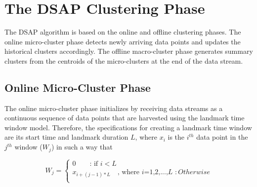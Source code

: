 \documentclass[../UNBThesis2.tex]{subfiles}
\begin{document}





\section{The DSAP Clustering Phase}
The DSAP algorithm is based on the online and offline clustering phases. The online micro-cluster phase detects newly arriving data points and updates the historical clusters accordingly. The offline macro-cluster phase generates summary clusters from the centroids of the micro-clusters at the end of the data stream. 




\subsection{Online Micro-Cluster Phase}

 The online micro-cluster phase initializes by receiving data streams as a continuous sequence of data points that are harvested using the landmark time window model. Therefore, the specifications for creating a landmark time window are its start time and landmark duration $L$, where
 $x_i$ is the $i^{th}$ data point in the $j^{th}$ window ($W_j$) in such a way that
 
  \begin{equation}
W_j = \begin{cases}
    0 \quad \phantom{\infty}\text{: if}\,\, i < L  \\
    x_{i+(j-1)*L} \quad \phantom{}  \text{, where $i$=1,2,...,$L$}\,\, :Otherwise \\ \label{landmarkcal}
      \end{cases}
    \end{equation} 
 
\end{document}
